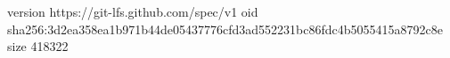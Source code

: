 version https://git-lfs.github.com/spec/v1
oid sha256:3d2ea358ea1b971b44de05437776cfd3ad552231bc86fdc4b5055415a8792c8e
size 418322
